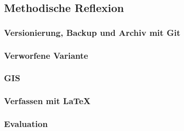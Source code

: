 \begin{multicols}{2}
\subsection{Methodische Reflexion}
\subsubsection{Versionierung, Backup und Archiv mit Git}
\subsubsection{Verworfene Variante}
\subsubsection{GIS}
\subsubsection{Verfassen mit \LaTeX}
\subsubsection{Evaluation}


\end{multicols}
